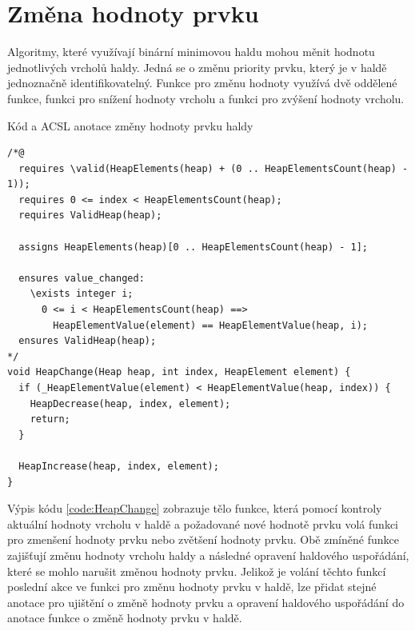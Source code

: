\section{Změna hodnoty prvku}
\label{subsec:HeapChange}

Algoritmy, které využívají binární minimovou haldu mohou měnit hodnotu jednotlivých vrcholů haldy. Jedná se o změnu priority prvku, který je v haldě jednoznačně identifikovatelný. Funkce pro změnu hodnoty využívá dvě oddělené funkce, funkci pro snížení hodnoty vrcholu a funkci pro zvýšení hodnoty vrcholu.

\begin{listing}[H]
	\caption{Kód a ACSL anotace změny hodnoty prvku haldy}
	\label{code:HeapChange}
	\begin{verbatim}
/*@
  requires \valid(HeapElements(heap) + (0 .. HeapElementsCount(heap) - 1));
  requires 0 <= index < HeapElementsCount(heap);
  requires ValidHeap(heap);

  assigns HeapElements(heap)[0 .. HeapElementsCount(heap) - 1];

  ensures value_changed:
    \exists integer i;
      0 <= i < HeapElementsCount(heap) ==>
        HeapElementValue(element) == HeapElementValue(heap, i);
  ensures ValidHeap(heap);
*/
void HeapChange(Heap heap, int index, HeapElement element) {
  if (_HeapElementValue(element) < HeapElementValue(heap, index)) {
    HeapDecrease(heap, index, element);
    return;
  }

  HeapIncrease(heap, index, element);
}
	\end{verbatim}
\end{listing}

Výpis kódu \ref{code:HeapChange} zobrazuje tělo funkce, která pomocí kontroly aktuální hodnoty vrcholu v haldě a požadované nové hodnotě prvku volá funkci pro zmenšení hodnoty prvku nebo zvětšení hodnoty prvku. Obě zmíněné funkce zajišťují změnu hodnoty vrcholu haldy a následné opravení haldového uspořádání, které se mohlo narušit změnou hodnoty prvku. Jelikož je volání těchto funkcí poslední akce ve funkci pro změnu hodnoty prvku v haldě, lze přidat stejné anotace pro ujištění o změně hodnoty prvku a opravení haldového uspořádání do anotace funkce o změně hodnoty prvku v haldě.

